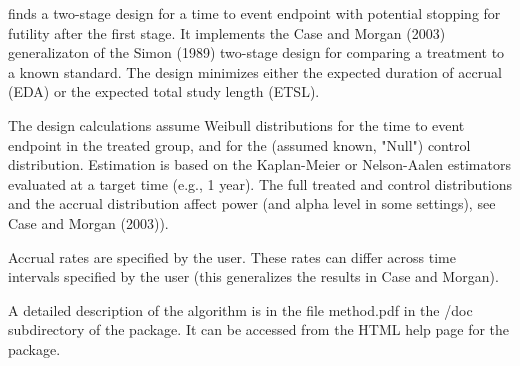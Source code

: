 \begin{Details}\relax
{} finds a two-stage design for a time to event endpoint
with potential stopping for futility after the first stage.  It
implements the Case and Morgan (2003) generalizaton of the Simon
(1989) two-stage design for comparing a treatment to a known standard.
The design minimizes either the expected duration of accrual (EDA) or
the expected total study length (ETSL).

The design calculations assume Weibull distributions for the time to
event endpoint in the treated group, and for the (assumed known, "Null") control
distribution.  Estimation is  based on the Kaplan-Meier or
Nelson-Aalen estimators evaluated at a target time (e.g., 1 year).
The full treated and control distributions and the accrual
distribution  affect power (and alpha level in some settings), see Case and Morgan (2003)).

Accrual rates are specified by the user.  These rates can differ
across time intervals specified by the user (this generalizes the
results in Case and Morgan).

A detailed description of the algorithm is in the file method.pdf in
the /doc subdirectory of the  package.  It can be accessed from the
HTML help page for the package.
\end{Details}
